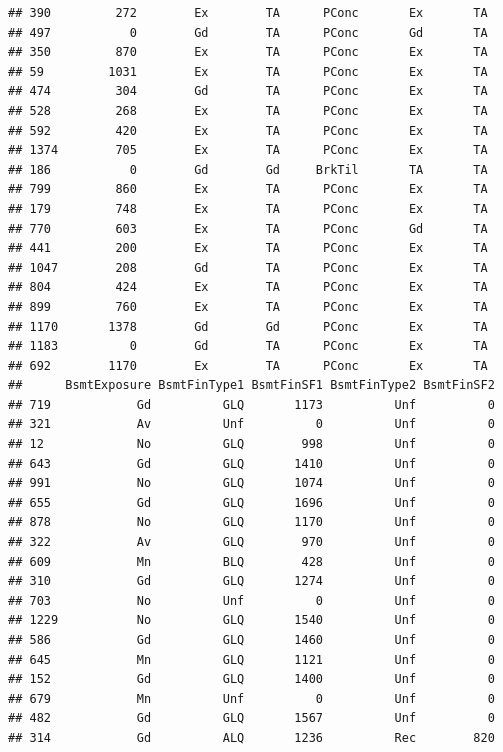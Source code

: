 \documentclass[]{article}
\begin{document}
\begin{verbatim}
## 390         272        Ex        TA      PConc       Ex       TA
## 497           0        Gd        TA      PConc       Gd       TA
## 350         870        Ex        TA      PConc       Ex       TA
## 59         1031        Ex        TA      PConc       Ex       TA
## 474         304        Gd        TA      PConc       Ex       TA
## 528         268        Ex        TA      PConc       Ex       TA
## 592         420        Ex        TA      PConc       Ex       TA
## 1374        705        Ex        TA      PConc       Ex       TA
## 186           0        Gd        Gd     BrkTil       TA       TA
## 799         860        Ex        TA      PConc       Ex       TA
## 179         748        Ex        TA      PConc       Ex       TA
## 770         603        Ex        TA      PConc       Gd       TA
## 441         200        Ex        TA      PConc       Ex       TA
## 1047        208        Gd        TA      PConc       Ex       TA
## 804         424        Ex        TA      PConc       Ex       TA
## 899         760        Ex        TA      PConc       Ex       TA
## 1170       1378        Gd        Gd      PConc       Ex       TA
## 1183          0        Gd        TA      PConc       Ex       TA
## 692        1170        Ex        TA      PConc       Ex       TA
##      BsmtExposure BsmtFinType1 BsmtFinSF1 BsmtFinType2 BsmtFinSF2
## 719            Gd          GLQ       1173          Unf          0
## 321            Av          Unf          0          Unf          0
## 12             No          GLQ        998          Unf          0
## 643            Gd          GLQ       1410          Unf          0
## 991            No          GLQ       1074          Unf          0
## 655            Gd          GLQ       1696          Unf          0
## 878            No          GLQ       1170          Unf          0
## 322            Av          GLQ        970          Unf          0
## 609            Mn          BLQ        428          Unf          0
## 310            Gd          GLQ       1274          Unf          0
## 703            No          Unf          0          Unf          0
## 1229           No          GLQ       1540          Unf          0
## 586            Gd          GLQ       1460          Unf          0
## 645            Mn          GLQ       1121          Unf          0
## 152            Gd          GLQ       1400          Unf          0
## 679            Mn          Unf          0          Unf          0
## 482            Gd          GLQ       1567          Unf          0
## 314            Gd          ALQ       1236          Rec        820

\end{verbatim}
\end{document}
